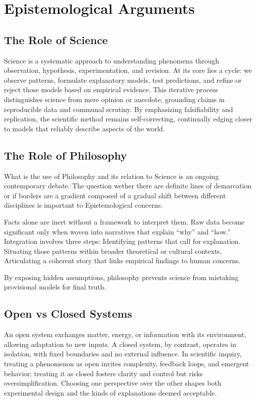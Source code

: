 \documentclass[a4paper]{article}
\begin{document}
\section{Epistemological Arguments}
\subsection{The Role of Science}
Science is a systematic approach to understanding phenomena through observation, hypothesis, experimentation, and revision. 
At its core lies a cycle: we observe patterns, formulate explanatory models, test predictions, and refine or reject those models based on empirical evidence. 
This iterative process distinguishes science from mere opinion or anecdote, grounding claims in reproducible data and communal scrutiny. 
By emphasizing falsifiability and replication, the scientific method remains self-correcting, continually edging closer to models that reliably describe aspects of the world.

\subsection{The Role of Philosophy}
What is the use of Philosophy and its relation to Science is an ongoing contemporary debate. 
The question wether there are definite lines of demarcation or if borders are a gradient composed of a gradual shift between different disciplines is important to Epistemological concerns.

Facts alone are inert without a framework to interpret them. 
Raw data become significant only when woven into narratives that explain “why” and “how.” 
Integration involves three steps:
    Identifying patterns that call for explanation.
    Situating those patterns within broader theoretical or cultural contexts.
    Articulating a coherent story that links empirical findings to human concerns.

By exposing hidden assumptions, philosophy prevents science from mistaking provisional models for final truth.


\subsection{Open vs Closed Systems}
An open system exchanges matter, energy, or information with its environment, allowing adaptation to new inputs. 
A closed system, by contrast, operates in isolation, with fixed boundaries and no external influence. 
In scientific inquiry, treating a phenomenon as open invites complexity, feedback loops, and emergent behavior; treating it as closed fosters clarity and control but risks oversimplification. 
Choosing one perspective over the other shapes both experimental design and the kinds of explanations deemed acceptable.
\end{document}
